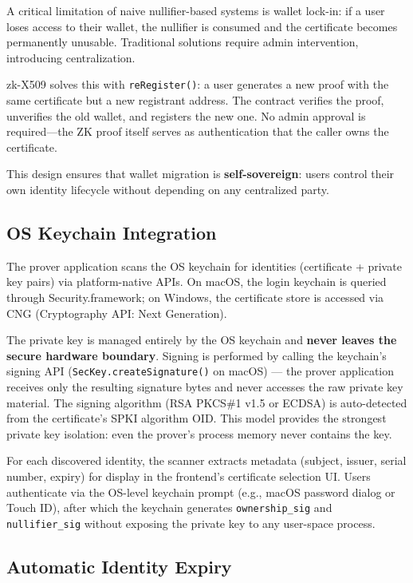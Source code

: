\documentclass[11pt, a4paper]{article}
\begin{document}
A critical limitation of naive nullifier-based systems is wallet
lock-in: if a user loses access to their wallet, the nullifier is
consumed and the certificate becomes permanently unusable. Traditional
solutions require admin intervention, introducing centralization.

zk-X509 solves this with \texttt{reRegister()}: a user generates a new
proof with the same certificate but a new registrant address. The
contract verifies the proof, unverifies the old wallet, and registers
the new one. No admin approval is required---the ZK proof itself serves
as authentication that the caller owns the certificate.

This design ensures that wallet migration is \textbf{self-sovereign}:
users control their own identity lifecycle without depending on any
centralized party.

\subsection{OS Keychain
Integration}\label{os-keychain-integration}

The prover application scans the OS keychain for identities (certificate +
private key pairs) via platform-native APIs. On macOS, the login
keychain is queried through Security.framework; on Windows, the
certificate store is accessed via CNG (Cryptography API: Next
Generation).

The private key is managed entirely by the OS keychain and \textbf{never
leaves the secure hardware boundary}. Signing is performed by calling
the keychain's signing API (\texttt{SecKey.createSignature()} on macOS)
--- the prover application receives only the resulting signature bytes and
never accesses the raw private key material. The signing algorithm (RSA
PKCS\#1 v1.5 or ECDSA) is auto-detected from the certificate's SPKI
algorithm OID. This model provides the strongest private key isolation:
even the prover's process memory never contains the key.

For each discovered identity, the scanner extracts metadata (subject,
issuer, serial number, expiry) for display in the frontend's certificate
selection UI. Users authenticate via the OS-level keychain prompt (e.g.,
macOS password dialog or Touch ID), after which the keychain generates
\texttt{ownership\_sig} and \texttt{nullifier\_sig} without exposing the
private key to any user-space process.

\subsection{Automatic Identity
Expiry}\label{automatic-identity-expiry}
\end{document}
